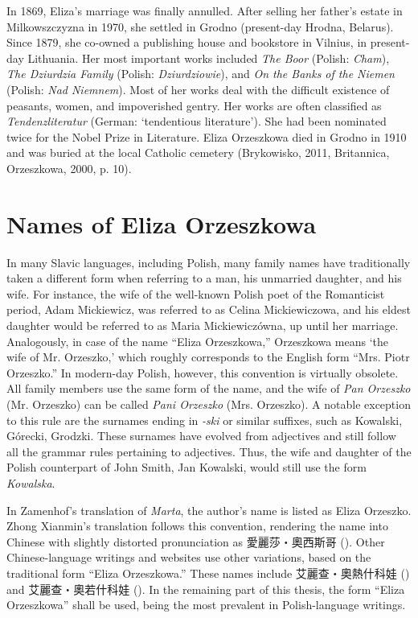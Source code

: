In 1869, Eliza's marriage was finally annulled.
After selling her father's estate in Milkowszczyzna in 1970, she settled in Grodno (present-day Hrodna, Belarus).
Since 1879, she co-owned a publishing house and bookstore in Vilnius, in present-day Lithuania.
Her most important works included \textit{The Boor} (Polish: \textit{Cham}), \textit{The Dziurdzia Family} (Polish: \textit{Dziurdziowie}), and \textit{On the Banks of the Niemen} (Polish: \textit{Nad Niemnem}).
Most of her works deal with the difficult existence of peasants, women, and impoverished gentry.
Her works are often classified as \textit{Tendenzliteratur} (German: `tendentious literature').
She had been nominated twice for the Nobel Prize in Literature.
Eliza Orzeszkowa died in Grodno in 1910 and was buried at the local Catholic cemetery
(Brykowisko, 2011, Britannica, Orzeszkowa, 2000, p. 10).

\section{Names of Eliza Orzeszkowa}
In many Slavic languages, including Polish, many family names have traditionally taken a different form when referring to a man, his unmarried daughter, and his wife.
For instance, the wife of the well-known Polish poet of the Romanticist period, Adam Mickiewicz, was referred to as Celina Mickiewiczowa, and his eldest daughter would be referred to as Maria Mickiewiczówna, up until her marriage.
Analogously, in case of the name ``Eliza Orzeszkowa,'' Orzeszkowa means `the wife of Mr. Orzeszko,' which roughly corresponds to the English form ``Mrs. Piotr Orzeszko.''
In modern-day Polish, however, this convention is virtually obsolete.
All family members use the same form of the name, and the wife of \textit{Pan Orzeszko} (Mr. Orzeszko) can be called \textit{Pani Orzeszko} (Mrs. Orzeszko).
A notable exception to this rule are the surnames ending in \textit{-ski} or similar suffixes, such as Kowalski, Górecki, Grodzki.
These surnames have evolved from adjectives and still follow all the grammar rules pertaining to adjectives.
Thus, the wife and daughter of the Polish counterpart of John Smith, Jan Kowalski, would still use the form \textit{Kowalska}. 

In Zamenhof's translation of \textit{Marta}, the author's name is listed as Eliza Orzeszko.
Zhong Xianmin's translation follows this convention, rendering the name into Chinese with slightly distorted pronunciation as 愛麗莎・奧西斯哥 ().
Other Chinese-language writings and websites use other variations, based on the traditional form ``Eliza Orzeszkowa.''
These names include 艾麗查・奧熱什科娃 () and 艾麗查・奧若什科娃 (). In the remaining part of this thesis, the form ``Eliza Orzeszkowa'' shall be used, being the most prevalent in Polish-language writings.

